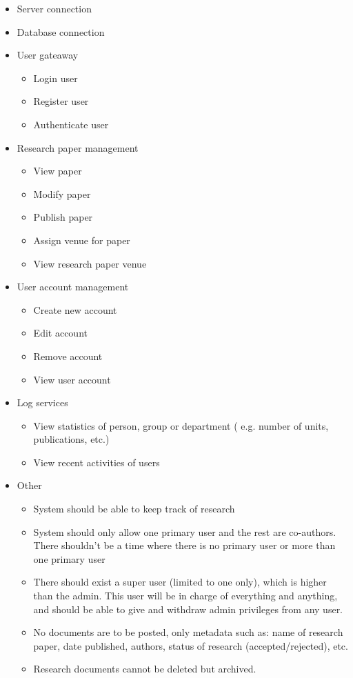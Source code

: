 \documentclass[11pt]{article}
\begin{document}
	\begin{itemize}
		\item Server connection
		\item Database connection
		\item User gateaway
		\begin{itemize}
			\item Login user
			\item Register user
			\item Authenticate user
		\end{itemize}
		\item Research paper management
		\begin{itemize}
			\item View paper
			\item Modify paper
			\item Publish paper
			\item Assign venue for paper
			\item View research paper venue
		\end{itemize}
		\item User account management
		\begin{itemize}
			\item Create new account
			\item Edit account
			\item Remove account
			\item View user account
		\end{itemize}
		\item Log services
		\begin{itemize}
			\item View statistics of person, group or department ( e.g. number of units, publications, etc.)
			\item View recent activities of users
		\end{itemize}
		\item Other
		\begin{itemize}
			\item System should be able to keep track of research
			\item System should only allow one primary user and the rest are co-authors. There shouldn’t be a time where there is no primary user or more than one primary user
			\item There should exist a super user (limited to one only), which is higher than the admin. This user will be in charge of everything and anything, and should be able to give and withdraw admin privileges from any user.
			\item No documents are to be posted, only metadata such as: name of research paper, date published, authors, status of research (accepted/rejected), etc.
			\item Research documents cannot be deleted but archived.
		\end{itemize}
		
	\end{itemize}
	
\end{document}
